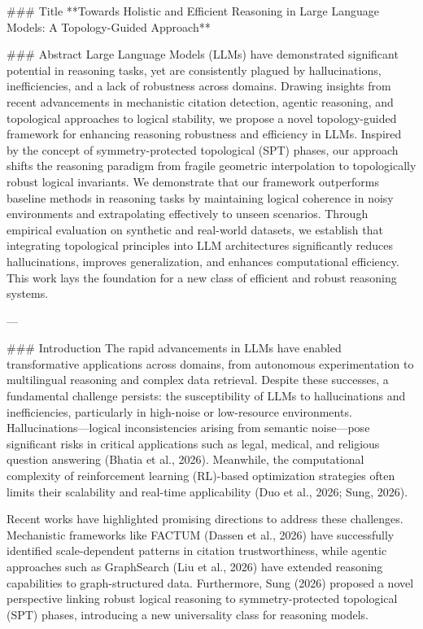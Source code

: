 ### Title
**Towards Holistic and Efficient Reasoning in Large Language Models: A Topology-Guided Approach**

### Abstract
Large Language Models (LLMs) have demonstrated significant potential in reasoning tasks, yet are consistently plagued by hallucinations, inefficiencies, and a lack of robustness across domains. Drawing insights from recent advancements in mechanistic citation detection, agentic reasoning, and topological approaches to logical stability, we propose a novel topology-guided framework for enhancing reasoning robustness and efficiency in LLMs. Inspired by the concept of symmetry-protected topological (SPT) phases, our approach shifts the reasoning paradigm from fragile geometric interpolation to topologically robust logical invariants. We demonstrate that our framework outperforms baseline methods in reasoning tasks by maintaining logical coherence in noisy environments and extrapolating effectively to unseen scenarios. Through empirical evaluation on synthetic and real-world datasets, we establish that integrating topological principles into LLM architectures significantly reduces hallucinations, improves generalization, and enhances computational efficiency. This work lays the foundation for a new class of efficient and robust reasoning systems.

---

### Introduction
The rapid advancements in LLMs have enabled transformative applications across domains, from autonomous experimentation to multilingual reasoning and complex data retrieval. Despite these successes, a fundamental challenge persists: the susceptibility of LLMs to hallucinations and inefficiencies, particularly in high-noise or low-resource environments. Hallucinations—logical inconsistencies arising from semantic noise—pose significant risks in critical applications such as legal, medical, and religious question answering (Bhatia et al., 2026). Meanwhile, the computational complexity of reinforcement learning (RL)-based optimization strategies often limits their scalability and real-time applicability (Duo et al., 2026; Sung, 2026).

Recent works have highlighted promising directions to address these challenges. Mechanistic frameworks like FACTUM (Dassen et al., 2026) have successfully identified scale-dependent patterns in citation trustworthiness, while agentic approaches such as GraphSearch (Liu et al., 2026) have extended reasoning capabilities to graph-structured data. Furthermore, Sung (2026) proposed a novel perspective linking robust logical reasoning to symmetry-protected topological (SPT) phases, introducing a new universality class for reasoning models.

